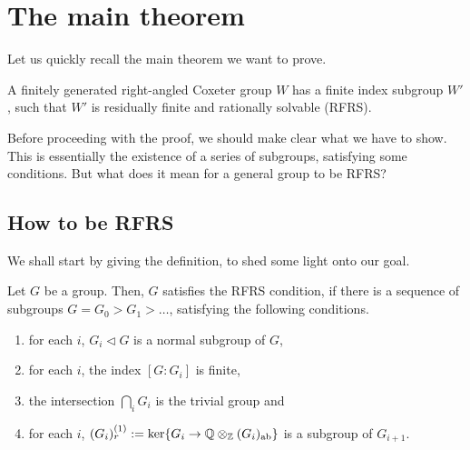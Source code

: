 \chapter{The main theorem}

Let us quickly recall the main theorem we want to prove.

\begin{theorem*}
    A finitely generated right-angled Coxeter group \(W\) has a finite index subgroup \(W'\), such that \(W'\) is residually finite and rationally solvable (RFRS).
\end{theorem*}

Before proceeding with the proof, we should make clear what we have to show.
This is essentially the existence of a series of subgroups, satisfying some conditions.
But what does it mean for a general group to be RFRS?\vspace*{-\parskip}


\section{How to be RFRS}

We shall start by giving the definition, to shed some light onto our goal.

\begin{definition}
    Let \(G\) be a group.
    Then, \(G\) satisfies the RFRS condition, if there is a sequence of subgroups \(G = G_0 > G_1 > \ldots\), satisfying the following conditions.
    \begin{enumerate}
        \item for each \(i\), \(G_i \triangleleft G\) is a normal subgroup of \(G\),
        \item for each \(i\), the index \([G : G_i]\) is finite,
        \item the intersection \(\bigcap_i G_i\) is the trivial group and
        \item for each \(i\), \((G_i)_r^{(1)} := \ker\{G_i \to \mathbb{Q} \otimes_{\mathbb{Z}} (G_i)_{\text{ab}}\}\) is a subgroup of \(G_{i+1}\).
    \end{enumerate}
\end{definition}


